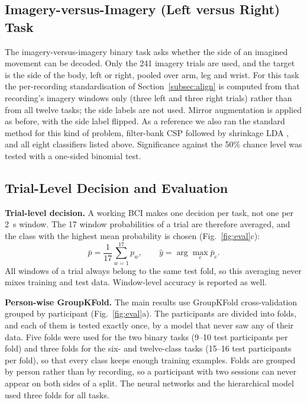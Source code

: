 \documentclass[pdflatex,sn-mathphys-num]{sn-jnl}%
\theoremstyle{thmstyleone}%
\theoremstyle{thmstyletwo}%
\theoremstyle{thmstylethree}%
\begin{document}
\subsection{Imagery-versus-Imagery (Left versus Right) Task}\label{subsec:lr}

The imagery-versus-imagery binary task asks whether the side of an imagined movement can be decoded. Only the 241 imagery trials are used, and the target is the side of the body, left or right, pooled over arm, leg and wrist. For this task the per-recording standardisation of Section~\ref{subsec:align} is computed from that recording's imagery windows only (three left and three right trials) rather than from all twelve tasks; the side labels are not used. Mirror augmentation is applied as before, with the side label flipped. As a reference we also ran the standard method for this kind of problem, filter-bank CSP followed by shrinkage LDA \citep{Ang2012}, and all eight classifiers listed above. Significance against the 50\% chance level was tested with a one-sided binomial test.

\subsection{Trial-Level Decision and Evaluation}\label{subsec:eval}

\textbf{Trial-level decision.} A working BCI makes one decision per task, not one per 2~s window. The 17 window probabilities of a trial are therefore averaged, and the class with the highest mean probability is chosen (Fig.~\ref{fig:eval}c):
\begin{equation}
\bar{p} = \frac{1}{17} \sum_{w=1}^{17} p_w, \qquad \hat{y} = \arg\max_c \bar{p}_c .
\end{equation}
All windows of a trial always belong to the same test fold, so this averaging never mixes training and test data. Window-level accuracy is reported as well.

\textbf{Person-wise GroupKFold.} The main results use GroupKFold cross-validation grouped by participant (Fig.~\ref{fig:eval}a). The participants are divided into folds, and each of them is tested exactly once, by a model that never saw any of their data. Five folds were used for the two binary tasks (9--10 test participants per fold) and three folds for the six- and twelve-class tasks (15--16 test participants per fold), so that every class keeps enough training examples. Folds are grouped by person rather than by recording, so a participant with two sessions can never appear on both sides of a split. The neural networks and the hierarchical model used three folds for all tasks.
\end{document}
